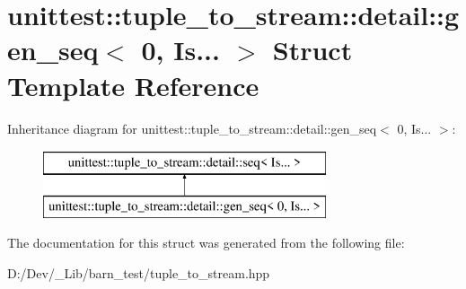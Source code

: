 \hypertarget{structunittest_1_1tuple__to__stream_1_1detail_1_1gen__seq_3_010_00_01_is_8_8_8_01_4}{}\section{unittest\+:\+:tuple\+\_\+to\+\_\+stream\+:\+:detail\+:\+:gen\+\_\+seq$<$ 0, Is... $>$ Struct Template Reference}
\label{structunittest_1_1tuple__to__stream_1_1detail_1_1gen__seq_3_010_00_01_is_8_8_8_01_4}
Inheritance diagram for unittest\+:\+:tuple\+\_\+to\+\_\+stream\+:\+:detail\+:\+:gen\+\_\+seq$<$ 0, Is... $>$\+:\begin{figure}[H]
\begin{center}
\leavevmode
\includegraphics[height=2.000000cm]{structunittest_1_1tuple__to__stream_1_1detail_1_1gen__seq_3_010_00_01_is_8_8_8_01_4}
\end{center}
\end{figure}


The documentation for this struct was generated from the following file\+:\begin{DoxyCompactItemize}
\item 
D\+:/\+Dev/\+\_\+\+Lib/barn\+\_\+test/tuple\+\_\+to\+\_\+stream.\+hpp\end{DoxyCompactItemize}

